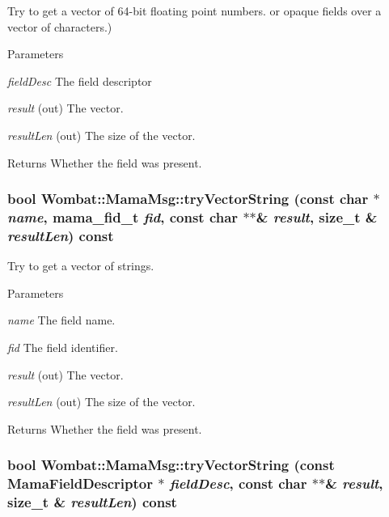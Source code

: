 Try to get a vector of 64-\/bit floating point numbers. or opaque fields over a vector of characters.) 
\begin{DoxyParams}{Parameters}
\item[{\em fieldDesc}]The field descriptor \item[{\em result}](out) The vector. \item[{\em resultLen}](out) The size of the vector. \end{DoxyParams}
\begin{DoxyReturn}{Returns}
Whether the field was present. 
\end{DoxyReturn}
\hypertarget{classWombat_1_1MamaMsg_a711caae570aeb5b314b630f7c6377dcf}{
\subsubsection[{tryVectorString}]{\setlength{\rightskip}{0pt plus 5cm}bool Wombat::MamaMsg::tryVectorString (const char $\ast$ {\em name}, \/  mama\_\-fid\_\-t {\em fid}, \/  const char $\ast$$\ast$\& {\em result}, \/  size\_\-t \& {\em resultLen}) const}}
\label{classWombat_1_1MamaMsg_a711caae570aeb5b314b630f7c6377dcf}


Try to get a vector of strings. 
\begin{DoxyParams}{Parameters}
\item[{\em name}]The field name. \item[{\em fid}]The field identifier. \item[{\em result}](out) The vector. \item[{\em resultLen}](out) The size of the vector. \end{DoxyParams}
\begin{DoxyReturn}{Returns}
Whether the field was present. 
\end{DoxyReturn}
\hypertarget{classWombat_1_1MamaMsg_aac7467df406b4718a0139e38267203ac}{
\subsubsection[{tryVectorString}]{\setlength{\rightskip}{0pt plus 5cm}bool Wombat::MamaMsg::tryVectorString (const {\bf MamaFieldDescriptor} $\ast$ {\em fieldDesc}, \/  const char $\ast$$\ast$\& {\em result}, \/  size\_\-t \& {\em resultLen}) const}}
\label{classWombat_1_1MamaMsg_aac7467df406b4718a0139e38267203ac}


